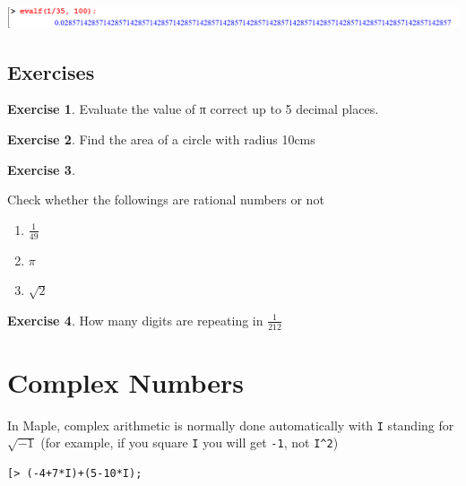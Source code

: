 \documentclass[
]{book}
\providecommand{\tightlist}{%
  \setlength{\itemsep}{0pt}\setlength{\parskip}{0pt}}
\theoremstyle{definition}
\theoremstyle{definition}
\theoremstyle{definition}
\newtheorem{exercise}{Exercise}[chapter]
\theoremstyle{definition}
\theoremstyle{remark}
\begin{document}
\includegraphics{figures/Lesson 1/fig41.png}

\subsection{Exercises}\label{exercises-3}

\begin{exercise}
\protect\hypertarget{exr:unnamed-chunk-66}{}\label{exr:unnamed-chunk-66}Evaluate the value of π correct up to 5 decimal places.
\end{exercise}

\begin{exercise}
\protect\hypertarget{exr:unnamed-chunk-67}{}\label{exr:unnamed-chunk-67}Find the area of a circle with radius 10cms
\end{exercise}

\begin{exercise}
\protect\hypertarget{exr:unnamed-chunk-68}{}\label{exr:unnamed-chunk-68}

Check whether the followings are rational numbers or not

\begin{enumerate}
\def\labelenumi{\roman{enumi}.}
\tightlist
\item
  \(\frac{1}{49}\)
\item
  \(\pi\)
\item
  \(\sqrt{2}\)
\end{enumerate}

\end{exercise}

\begin{exercise}
\protect\hypertarget{exr:unnamed-chunk-69}{}\label{exr:unnamed-chunk-69}How many digits are repeating in \(\frac{1}{212}\)
\end{exercise}

\section{Complex Numbers}\label{complex-numbers-1}

In Maple, complex arithmetic is normally done automatically with \texttt{I} standing for \(\sqrt{−1}\) (for example, if you square \texttt{I} you will get \texttt{-1}, not \texttt{I\^{}2})

\begin{verbatim}
[> (-4+7*I)+(5-10*I);
\end{verbatim}
\end{document}
